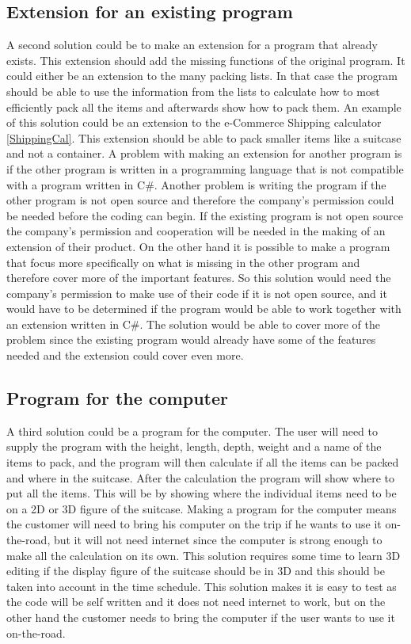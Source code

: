 \subsection{Extension for an existing program}
A second solution could be to make an extension for a program that already exists. This extension should add the missing functions of the original program. It could either be an extension to the many packing lists. In that case the program should be able to use the information from the lists to calculate how to most efficiently pack all the items and afterwards show how to pack them. An example of this solution could be an extension to the e-Commerce Shipping calculator \ref{ShippingCal}. This extension should be able to pack smaller items like a suitcase and not a container. A problem with making an extension for another program is if the other program is written in a programming language that is not compatible with a program written in C\#. Another problem is writing the program if the other program is not open source and therefore the company's permission could be needed before the coding can begin. If the existing program is not open source the company's permission and cooperation will be needed in the making of an extension of their product. On the other hand it is possible to make a program that focus more specifically on what is missing in the other program and therefore cover more of the important features. So this solution would need the company's permission to make use of their code if it is not open source, and it would have to be determined if the program would be able to work together with an extension written in C\#. The solution would be able to cover more of the problem since the existing program would already have some of the features needed and the extension could cover even more.

\subsection{Program for the computer}
A third solution could be a program for the computer. The user will need to supply the program with the height, length, depth, weight and a name of the items to pack, and the program will then calculate if all the items can be packed and where in the suitcase. After the calculation the program will show where to put all the items. This will be by showing where the individual items need to be on a 2D or 3D figure of the suitcase. Making a program for the computer means the customer will need to bring his computer on the trip if he wants to use it on-the-road, but it will not need internet since the computer is strong enough to make all the calculation on its own. This solution requires some time to learn 3D editing if the display figure of the suitcase should be in 3D and this should be taken into account in the time schedule. This solution makes it is easy to test as the code will be self written and it does not need internet to work, but on the other hand the customer needs to bring the computer if the user wants to use it on-the-road.

